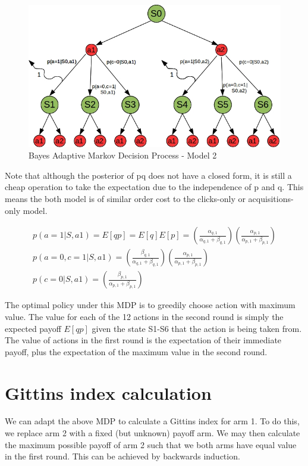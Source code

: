 \documentclass[11pt,a4,singlespacing,titlepagenumber=on]{scrreprt}
\numberwithin{equation}{chapter} %
\theoremstyle{remark}
\begin{document}
\begin{figure}[p]
    \centering
    \includegraphics[scale=0.6]{BAMDP.jpg}
    \caption{ Bayes Adaptive Markov Decision Process - Model 2 }
\end{figure}


Note that although the posterior of pq does not have a closed form, it is still a cheap operation to take the expectation due to the independence of p and q. This means the both model is of similar order cost to the clicks-only or acquisitions-only model.

\begin{align}
	p(a=1|S,a1) = E[qp] = E[q]E[p] = 
		\left( \frac{ \alpha_{q,1} }{ \alpha_{q,1} + \beta_{q,1} } \right)
		\left( \frac{ \alpha_{p,1} }{ \alpha_{p,1} + \beta_{p,1} } \right) \\
	p(a=0,c=1|S,a1) = 
		\left( \frac{ \beta_{q,1} }{ \alpha_{q,1} + \beta_{q,1} } \right)
		\left( \frac{ \alpha_{p,1} }{ \alpha_{p,1} + \beta_{p,1} } \right) \\
	p(c=0|S,a1) = 
		\left( \frac{ \beta_{p,1} }{ \alpha_{p,1} + \beta_{p,1} } \right) 
\end{align}	

The optimal policy under this MDP is to greedily choose action with maximum value. The value for each of the 12 actions in the second round is simply the expected payoff $E[qp]$ given the state S1-S6 that the action is being taken from. The value of actions in the first round is the expectation of their immediate payoff, plus the expectation of the maximum value in the second round.

\section{Gittins index calculation}

We can adapt the above MDP to calculate a Gittins index for arm 1. To do this, we replace arm 2 with a fixed (but unknown) payoff arm. We may then calculate the maximum possible payoff of arm 2 such that we both arms have equal value in the first round. This can be achieved by backwards induction.
\end{document}
